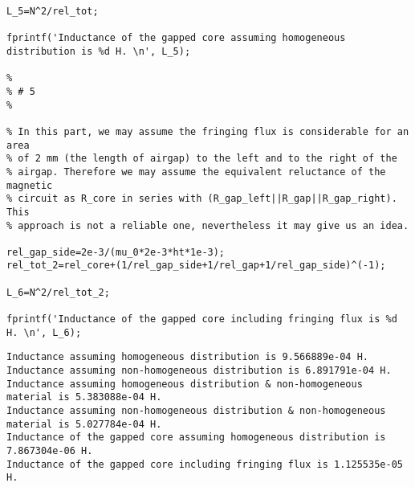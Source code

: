 \begin{verbatim}
L_5=N^2/rel_tot;

fprintf('Inductance of the gapped core assuming homogeneous distribution is %d H. \n', L_5);

%
% # 5
%

% In this part, we may assume the fringing flux is considerable for an area
% of 2 mm (the length of airgap) to the left and to the right of the
% airgap. Therefore we may assume the equivalent reluctance of the magnetic
% circuit as R_core in series with (R_gap_left||R_gap||R_gap_right). This
% approach is not a reliable one, nevertheless it may give us an idea.

rel_gap_side=2e-3/(mu_0*2e-3*ht*1e-3);
rel_tot_2=rel_core+(1/rel_gap_side+1/rel_gap+1/rel_gap_side)^(-1);

L_6=N^2/rel_tot_2;

fprintf('Inductance of the gapped core including fringing flux is %d H. \n', L_6);
\end{verbatim}

        \color{lightgray} \begin{verbatim}Inductance assuming homogeneous distribution is 9.566889e-04 H. 
Inductance assuming non-homogeneous distribution is 6.891791e-04 H. 
Inductance assuming homogeneous distribution & non-homogeneous material is 5.383088e-04 H. 
Inductance assuming non-homogeneous distribution & non-homogeneous material is 5.027784e-04 H. 
Inductance of the gapped core assuming homogeneous distribution is 7.867304e-06 H. 
Inductance of the gapped core including fringing flux is 1.125535e-05 H. 
\end{verbatim} \color{black}
    